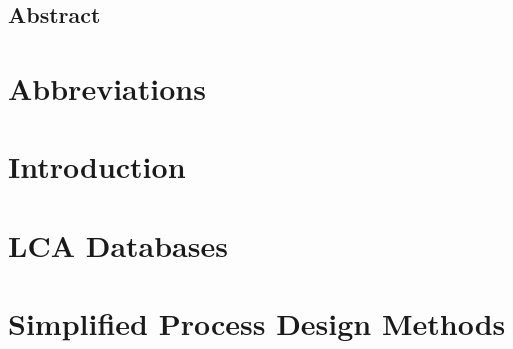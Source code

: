 


\setlength{\parindent}{0em}
\setlength{\parskip}{0.5em}



\restoregeometry


\setcounter{page}{1}
\begin{titlepage}
\chapter*{Abstract}

\end{titlepage}
\cleardoublepage



\thispagestyle{plain}


\tableofcontents

\cleardoublepage


\cleardoublepage
 \thispagestyle{plain}
\listoffigures
 \thispagestyle{plain}
\listoftables
%
\cleardoublepage


\chapter*{Abbreviations}



\cleardoublepage

\setcounter{page}{1}
%



\chapter{Introduction}


\chapter{\acl{LCA} Databases}


\chapter{Simplified Process Design Methods}


